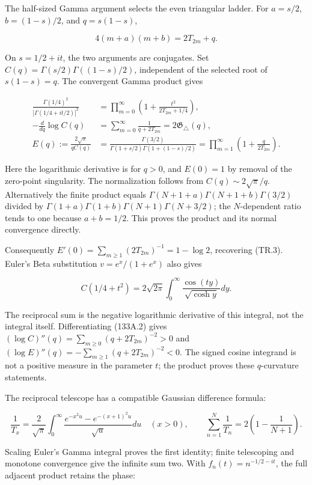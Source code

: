 \documentclass[
  11pt,
]{book}
\begin{document}
The half-sized Gamma argument selects the even triangular ladder. For
\(a=s/2\), \(b=(1-s)/2\), and \(q=s(1-s)\),

\[
4(m+a)(m+b)=2T_{2m}+q.
\tag{133A.1}
\]

On \(s=1/2+it\), the two arguments are conjugates. Set
\(C(q)=\Gamma(s/2)\Gamma((1-s)/2)\), independent of the selected root of
\(s(1-s)=q\). The convergent Gamma product gives

\[
\begin{aligned}
\frac{\Gamma(1/4)^2}{|\Gamma(1/4+it/2)|^2}
 &=\prod_{m=0}^\infty\left(1+\frac{t^2}{2T_{2m}+1/4}\right),\\
-\frac{d}{dq}\log C(q)
 &=\sum_{m=0}^\infty\frac1{q+2T_{2m}}=2\mathfrak G_\triangle(q),\\
E(q):=\frac{2\sqrt\pi}{qC(q)}
 &=\frac{\Gamma(3/2)}{\Gamma(1+s/2)\Gamma(1+(1-s)/2)}
 =\prod_{m=1}^\infty\left(1+\frac q{2T_{2m}}\right).
\end{aligned}
\tag{133A.2}
\]

Here the logarithmic derivative is for \(q>0\), and \(E(0)=1\) by
removal of the zero-point singularity. The normalization follows from
\(C(q)\sim2\sqrt\pi/q\). Alternatively the finite product equals
\(\Gamma(N+1+a)\Gamma(N+1+b)\Gamma(3/2)\) divided by
\(\Gamma(1+a)\Gamma(1+b)\Gamma(N+1)\Gamma(N+3/2)\); the \(N\)-dependent
ratio tends to one because \(a+b=1/2\). This proves the product and its
normal convergence directly.

Consequently \(E'(0)=\sum_{m\ge1}(2T_{2m})^{-1}=1-\log2\), recovering
(TR.3). Euler's Beta substitution \(v=e^x/(1+e^x)\) also gives

\[
C(1/4+t^2)=2\sqrt{2\pi}\int_0^\infty
 \frac{\cos(ty)}{\sqrt{\cosh y}}dy.
\tag{133A.3}
\]

The reciprocal sum is the negative logarithmic derivative of this
integral, not the integral itself. Differentiating (133A.2) gives
\((\log C)''(q)=\sum_{m\ge0}(q+2T_{2m})^{-2}>0\) and
\((\log E)''(q)=-\sum_{m\ge1}(q+2T_{2m})^{-2}<0\). The signed cosine
integrand is not a positive measure in the parameter \(t\); the product
proves these \(q\)-curvature statements.

The reciprocal telescope has a compatible Gaussian difference formula:

\[
\frac1{T_x}=\frac2{\sqrt\pi}\int_0^\infty
 \frac{e^{-x^2u}-e^{-(x+1)^2u}}{\sqrt u}du\quad(x>0),\qquad
\sum_{n=1}^N\frac1{T_n}=2\left(1-\frac1{N+1}\right).
\tag{133A.4}
\]

Scaling Euler's Gamma integral proves the first identity; finite
telescoping and monotone convergence give the infinite sum two. With
\(f_n(t)=n^{-1/2-it}\), the full adjacent product retains the phase:
\end{document}
